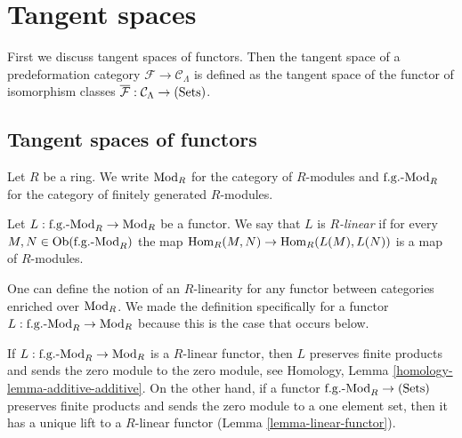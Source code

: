 \section{Tangent spaces}
\label{section-tangent-spaces}

\noindent
First we discuss tangent spaces of functors. Then the tangent space of a 
predeformation category $\mathcal F \rightarrow \mathcal C_{\Lambda}$ is 
defined as the tangent space of the functor of isomorphism classes 
$\overline{\mathcal F}: \mathcal C_{\Lambda} \rightarrow \textnormal{(Sets)}$.



\subsection{Tangent spaces of functors}
\label{subsection-tangent-spaces-functors}

\noindent
Let $R$ be a ring. We write $\textnormal{Mod}_{R}$ for the category of 
$R$-modules and $\textnormal{f.g.-Mod}_{R}$ for the category of finitely 
generated $R$-modules.

\begin{definition}
\label{definition-linear}
Let $L: \textnormal{f.g.-Mod}_{R} \rightarrow \textnormal{Mod}_{R}$ be a 
functor.  We say that $L$ is {\it $R$-linear} if for every $M,N \in 
\textnormal{Ob}(\textnormal{f.g.-Mod}_{R})$ the map $\textnormal{Hom}_{R}(M,N) 
\rightarrow \textnormal{Hom}_{R}(L(M),L(N))$ is a map of $R$-modules.
\end{definition}

\begin{remark}
\label{remark-linear-enriched-over-modules}
One can define the notion of an $R$-linearity for any functor between 
categories enriched over $\textnormal{Mod}_{R}$. We made the definition 
specifically for a functor $L: \textnormal{f.g.-Mod}_{R} \rightarrow 
\textnormal{Mod}_{R}$ because this is the case that occurs below.
\end{remark}

\begin{remark}
\label{remark-linear-functor}
If $L: \textnormal{f.g.-Mod}_{R} \rightarrow \textnormal{Mod}_{R}$ is a 
$R$-linear functor, then $L$ preserves finite products and sends the zero 
module to the zero module, see
Homology, Lemma \ref{homology-lemma-additive-additive}.
On the other hand, if a functor
$\textnormal{f.g.-Mod}_{R} \rightarrow \textnormal{(Sets)}$ 
preserves finite products and sends the zero module to a one element set, then 
it has a unique lift to a $R$-linear functor (Lemma \ref{lemma-linear-functor}).
\end{remark}

